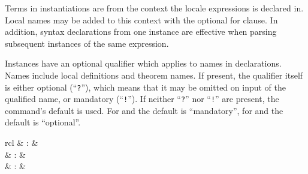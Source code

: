 \begin{isabellebody}
\begin{isamarkuptext}
  Terms in instantiations are from the context the locale expressions
  is declared in.  Local names may be added to this context with the
  optional for clause.  In addition, syntax declarations from one
  instance are effective when parsing subsequent instances of the same
  expression.

  Instances have an optional qualifier which applies to names in
  declarations.  Names include local definitions and theorem names.
  If present, the qualifier itself is either optional
  (``\texttt{?}''), which means that it may be omitted on input of the
  qualified name, or mandatory (``\texttt{!}'').  If neither
  ``\texttt{?}'' nor ``\texttt{!}'' are present, the command's default
  is used.  For \hyperlink{command.interpretation}{\mbox{}} and \hyperlink{command.interpret}{\mbox{}}
  the default is ``mandatory'', for \hyperlink{command.locale}{\mbox{}} and \hyperlink{command.sublocale}{\mbox{}} the default is ``optional''.%
\end{isamarkuptext}%
\isamarkuptrue%
%
\isamarkuptrue%
%
\begin{isamarkuptext}%
\begin{matharray}{rcl}
    \hypertarget{command.locale}{\hyperlink{command.locale}{\mbox{}}} & : &  \\
    \hypertarget{command.print-locale}{\hyperlink{command.print-locale}{\mbox{}}} & : &  \\
    \hypertarget{command.print-locales}{\hyperlink{command.print-locales}{\mbox{}}} & : &  \\

\end{matharray}
\end{isamarkuptext}
\end{isabellebody}
